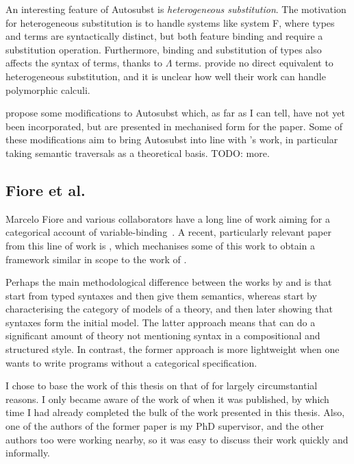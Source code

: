 An interesting feature of Autosubst is \emph{heterogeneous substitution}.
The motivation for heterogeneous substitution is to handle systems like system
F, where types and terms are syntactically distinct, but both feature binding
and require a substitution operation.
Furthermore, binding and substitution of types also affects the syntax of terms,
thanks to $\Lambda$ terms.
\citeauthor{AACMM21} provide no direct equivalent to heterogeneous substitution,
and it is unclear how well their work can handle polymorphic calculi.

\citet{Autosubst18} propose some modifications to Autosubst which, as far as I
can tell, have not yet been incorporated, but are presented in mechanised form
for the paper.
Some of these modifications aim to bring Autosubst into line with
\citeauthor{AACMM21}'s work, in particular taking semantic traversals as a
theoretical basis.
TODO: more.

\subsection{Fiore et al.}

Marcelo Fiore and various collaborators have a long line of work aiming for a
categorical account of variable-binding~\citep{FPT99,Fiore08,FH13,FH10,FM10}.
A recent, particularly relevant paper from this line of work is \citet{FS22},
which mechanises some of this work to obtain a framework similar in scope to
the work of \citet{AACMM21}.

Perhaps the main methodological difference between the works by
\citet{AACMM21} and \citet{FS22} is that \citet{AACMM21} start from typed
syntaxes and then give them semantics, whereas \citet{FS22} start by
characterising the category of models of a theory, and then later showing that
syntaxes form the initial model.
The latter approach means that \citeauthor{FS22} can do a significant amount of
theory not mentioning syntax in a compositional and structured style.
In contrast, the former approach is more lightweight when one wants to write
programs without a categorical specification.

I chose to base the work of this thesis on that of \citet{AACMM21} for largely
circumstantial reasons.
I only became aware of the work of \citet{FS22} when it was published, by which
time I had already completed the bulk of the work presented in this thesis.
Also, one of the authors of the former paper is my PhD supervisor, and the other
authors too were working nearby, so it was easy to discuss their work quickly
and informally.

